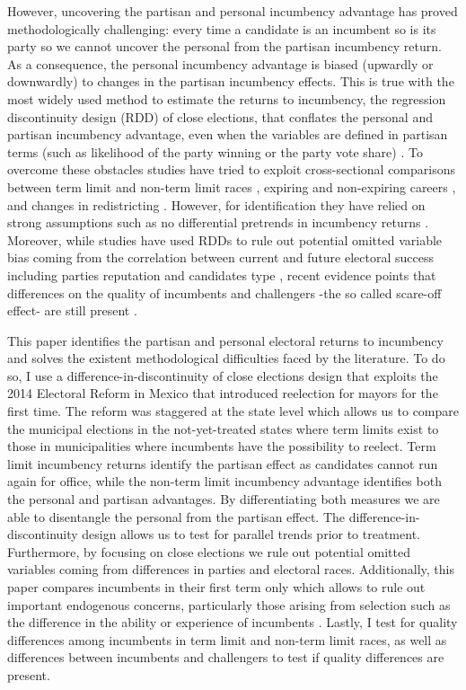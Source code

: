 \documentclass[12pt]{amsart}
\numberwithin{equation}{section}
\theoremstyle{definition}
\theoremstyle{definition}
\theoremstyle{definition}
\begin{document}
However, uncovering the partisan and personal incumbency advantage has proved methodologically challenging: every time a candidate is an incumbent so is its party so we cannot uncover the personal from the partisan incumbency return. As a consequence, the personal incumbency advantage is biased (upwardly or downwardly) to changes in the partisan incumbency effects. This is true with the most widely used method to estimate the returns to incumbency, the regression discontinuity design (RDD) of close elections, that conflates the personal and partisan incumbency advantage, even when the variables are defined in partisan terms (such as likelihood of the party winning or the party vote share) \citep{fowler_hall_2014}. To overcome these obstacles studies have tried to exploit cross-sectional comparisons between term limit and non-term limit races \citep{gelman_king_1990}, expiring and non-expiring careers \citep{fowler_hall_2014}, and changes in redistricting \citep{ansolabehere_etal_2000, desposato_petrocik_2003, sekhon_titiunik_2012}. However, for identification they have relied on strong assumptions such as no differential pretrends in incumbency returns \citep{fowler_hall_2014, ansolabehere_snyder_2004}. %
Moreover,  while studies have used RDDs to rule out potential omitted variable bias coming from the correlation between current and future electoral success including parties reputation and candidates type \citep{klasnja_titiunik_2017}, recent evidence points that differences on the quality of incumbents and challengers -the so called scare-off effect- are still present \citep{eggers_2017}. 

This paper identifies the partisan and personal electoral returns to incumbency and solves the existent methodological difficulties faced by the literature. To do so, I use a difference-in-discontinuity of close elections design that exploits the 2014 Electoral Reform in Mexico that introduced reelection for mayors for the first time. The reform was staggered at the state level which allows us to compare the municipal elections in the not-yet-treated states where term limits exist to those in municipalities where incumbents have the possibility to reelect. Term limit incumbency returns identify the partisan effect as candidates cannot run again for office, while the non-term limit incumbency advantage identifies both the personal and partisan advantages. By differentiating both measures we are able to disentangle the personal from the partisan effect. The difference-in-discontinuity design allows us to test for parallel trends prior to treatment. Furthermore, by focusing on close elections we rule out potential omitted variables coming from differences in parties and electoral races. Additionally, this paper compares incumbents in their first term only which allows to rule out important endogenous concerns, particularly those arising from selection such as the difference in the ability or experience of incumbents \citep{ferraz_finan_2008, ferraz_finan_2011}. Lastly, I test for quality differences among incumbents in term limit and non-term limit races, as well as differences between incumbents and challengers to test if quality differences are present. 
 
\end{document}
